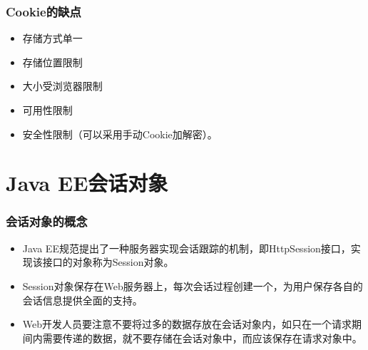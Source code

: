 \begin{frame}[fragile] %
\frametitle{Cookie的缺点}

\begin{itemize}\kai
\item 存储方式单一
\item 存储位置限制
\item 大小受浏览器限制
\item 可用性限制
\item 安全性限制（可以采用手动Cookie加解密）。
\end{itemize}

\end{frame}


\section{Java EE会话对象}

\begin{frame}[fragile] %
\frametitle{会话对象的概念}
\begin{itemize}
\item Java EE规范提出了一种服务器实现会话跟踪的机制，即HttpSession接口，实现该接口的对象称为Session对象。
\item Session对象保存在Web服务器上，每次会话过程创建一个，为用户保存各自的会话信息提供全面的支持。
\item Web开发人员要注意不要将过多的数据存放在会话对象内，如只在一个请求期间内需要传递的数据，就不要存储在会话对象中，而应该保存在{\Red\hei 请求对象}中。
\end{itemize}
\end{frame}


